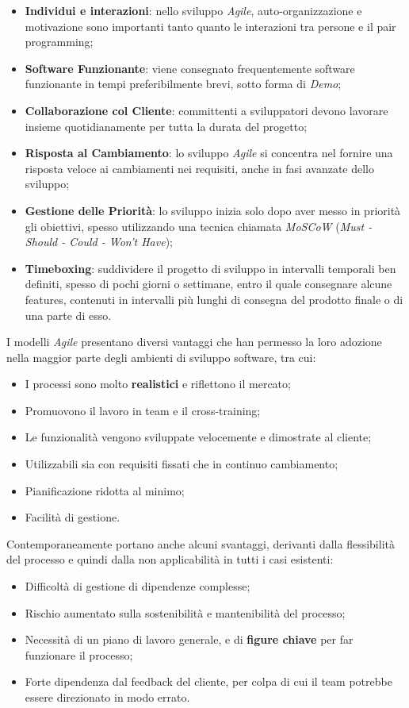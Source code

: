 \documentclass[a4paper,12pt]{report}
\begin{document}
				\begin{itemize}
					\item \textbf{Individui e interazioni}: nello sviluppo \emph{Agile}, auto-organizzazione e motivazione sono importanti tanto quanto le interazioni tra persone e il pair programming;
					\item \textbf{Software Funzionante}: viene consegnato frequentemente software funzionante in tempi preferibilmente brevi, sotto forma di \emph{Demo};
					\item \textbf{Collaborazione col Cliente}: committenti a sviluppatori devono lavorare insieme quotidianamente per tutta la durata del progetto;
					\item \textbf{Risposta al Cambiamento}: lo sviluppo \emph{Agile} si concentra nel fornire una risposta veloce ai cambiamenti nei requisiti, anche in fasi avanzate dello sviluppo;
					\item \textbf{Gestione delle Priorità}: lo sviluppo inizia solo dopo aver messo in priorità gli obiettivi, spesso utilizzando una tecnica chiamata \emph{MoSCoW} (\emph{Must - Should - Could - Won't Have});
					\item \textbf{Timeboxing}: suddividere il progetto di sviluppo in intervalli temporali ben definiti, spesso di pochi giorni o settimane, entro il quale consegnare alcune features, contenuti in intervalli più lunghi di consegna del prodotto finale o di una parte di esso.
				\end{itemize}
			
				I modelli \emph{Agile} presentano diversi vantaggi che han permesso la loro adozione nella maggior parte degli ambienti di sviluppo software, tra cui:
				\begin{itemize}
					\item I processi sono molto \textbf{realistici} e riflettono il mercato;
					\item Promuovono il lavoro in team e il cross-training;
					\item Le funzionalità vengono sviluppate velocemente e dimostrate al cliente;
					\item Utilizzabili sia con requisiti fissati che in continuo cambiamento;
					\item Pianificazione ridotta al minimo;
					\item Facilità di gestione.
				\end{itemize}
			
				Contemporaneamente portano anche alcuni svantaggi, derivanti dalla flessibilità del processo e quindi dalla non applicabilità in tutti i casi esistenti:
				\begin{itemize}
					\item Difficoltà di gestione di dipendenze complesse;
					\item Rischio aumentato sulla sostenibilità e mantenibilità del processo;
					\item Necessità di un piano di lavoro generale, e di \textbf{figure chiave} per far funzionare il processo;
					\item Forte dipendenza dal feedback del cliente, per colpa di cui il team potrebbe essere direzionato in modo errato.
				\end{itemize}
	
\end{document}
